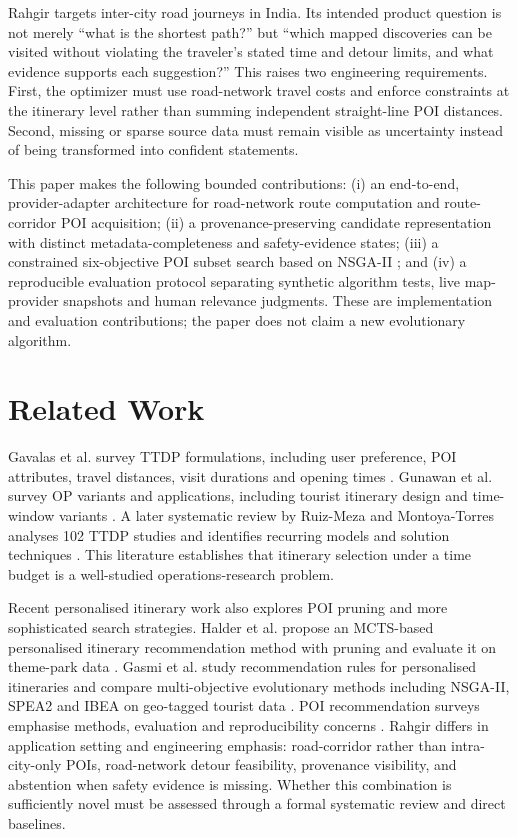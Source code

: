 \documentclass[10pt,conference]{IEEEtran}
\begin{document}
Rahgir targets inter-city road journeys in India. Its intended product question is not merely ``what is the shortest path?'' but ``which mapped discoveries can be visited without violating the traveler's stated time and detour limits, and what evidence supports each suggestion?'' This raises two engineering requirements. First, the optimizer must use road-network travel costs and enforce constraints at the itinerary level rather than summing independent straight-line POI distances. Second, missing or sparse source data must remain visible as uncertainty instead of being transformed into confident statements.

This paper makes the following bounded contributions: (i) an end-to-end, provider-adapter architecture for road-network route computation and route-corridor POI acquisition; (ii) a provenance-preserving candidate representation with distinct metadata-completeness and safety-evidence states; (iii) a constrained six-objective POI subset search based on NSGA-II \cite{deb2002}; and (iv) a reproducible evaluation protocol separating synthetic algorithm tests, live map-provider snapshots and human relevance judgments. These are implementation and evaluation contributions; the paper does not claim a new evolutionary algorithm.

\section{Related Work}
Gavalas et al. survey TTDP formulations, including user preference, POI attributes, travel distances, visit durations and opening times \cite{gavalas2014}. Gunawan et al. survey OP variants and applications, including tourist itinerary design and time-window variants \cite{gunawan2016}. A later systematic review by Ruiz-Meza and Montoya-Torres analyses 102 TTDP studies and identifies recurring models and solution techniques \cite{ruizmeza2022}. This literature establishes that itinerary selection under a time budget is a well-studied operations-research problem.

Recent personalised itinerary work also explores POI pruning and more sophisticated search strategies. Halder et al. propose an MCTS-based personalised itinerary recommendation method with pruning and evaluate it on theme-park data \cite{halder2022}. Gasmi et al. study recommendation rules for personalised itineraries and compare multi-objective evolutionary methods including NSGA-II, SPEA2 and IBEA on geo-tagged tourist data \cite{gasmi2024}. POI recommendation surveys emphasise methods, evaluation and reproducibility concerns \cite{werneck2021}. Rahgir differs in application setting and engineering emphasis: road-corridor rather than intra-city-only POIs, road-network detour feasibility, provenance visibility, and abstention when safety evidence is missing. Whether this combination is sufficiently novel must be assessed through a formal systematic review and direct baselines.
\end{document}

